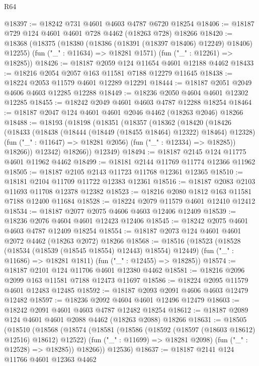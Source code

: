 \begin{lexlean}{R64}
\begin{coremodule}
@18397 := @18242 @731 @4601 @4603 @4787 @6720 @18254
@18406 := @18187 @729 @124 @4601 @4601 @728 @4462 (@18263 @728) @18266
@18420 := @18368
    (@18375
      (@18380 (@18386 (@18391 (@18397 @18406) @12249) @18406) @12255)
      (fun ("_" : @11634) => @18281 @1571)
      (fun ("_" : @12261) => @18285))
@18426 := @18187 @2059 @124 @11654 @4601 @12188 @4462
@18433 := @18216 @2054 @2057 @163 @11581 @7188 @12279 @11645
@18438 := @18224 @2053 @11579 @4601 @12289 @12291
@18444 := @18187 @2051 @2049 @4606 @4603 @12285 @12288
@18449 := @18236 @2050 @4604 @4601 @12302 @12285
@18455 := @18242 @2049 @4601 @4603 @4787 @12288 @18254
@18464 := @18187 @2047 @124 @4601 @4601 @2046 @4462 (@18263 @2046) @18266
@18488 := @18193
    (@18198
      (@18351
        (@18357
          (@18362
            (@18420
              (@18426
                (@18433
                  (@18438 (@18444 (@18449 (@18455 @18464) @12322) @18464) @12328)
                  (fun ("_" : @11647) => @18281 @2056)
                  (fun ("_" : @12334) => @18285))
                @18266))
            @12342)
          @18266))
      @12349)
@18494 := @18187 @2145 @124 @11775 @4601 @11962 @4462
@18499 := @18181 @2144 @11769 @11774 @12366 @11962
@18505 := @18187 @2105 @2143 @11723 @11768 @12361 @12365
@18510 := @18181 @2104 @11709 @11722 @12383 @12361
@18516 := @18187 @2083 @2103 @11693 @11708 @12378 @12382
@18523 := @18216 @2080 @1812 @163 @11581 @7188 @12400 @11684
@18528 := @18224 @2079 @11579 @4601 @12410 @12412
@18534 := @18187 @2077 @2075 @4606 @4603 @12406 @12409
@18539 := @18236 @2076 @4604 @4601 @12423 @12406
@18545 := @18242 @2075 @4601 @4603 @4787 @12409 @18254
@18554 := @18187 @2073 @124 @4601 @4601 @2072 @4462 (@18263 @2072) @18266
@18568 := @18516
    (@18523
      (@18528 (@18534 (@18539 (@18545 @18554) @12443) @18554) @12449)
      (fun ("_" : @11686) => @18281 @1811)
      (fun ("_" : @12455) => @18285))
@18574 := @18187 @2101 @124 @11706 @4601 @12380 @4462
@18581 := @18216 @2096 @2099 @163 @11581 @7188 @12473 @11697
@18586 := @18224 @2095 @11579 @4601 @12483 @12485
@18592 := @18187 @2093 @2091 @4606 @4603 @12479 @12482
@18597 := @18236 @2092 @4604 @4601 @12496 @12479
@18603 := @18242 @2091 @4601 @4603 @4787 @12482 @18254
@18612 := @18187 @2089 @124 @4601 @4601 @2088 @4462 (@18263 @2088) @18266
@18631 := @18505
    (@18510
      (@18568
        (@18574
          (@18581
            (@18586 (@18592 (@18597 (@18603 @18612) @12516) @18612) @12522)
            (fun ("_" : @11699) => @18281 @2098)
            (fun ("_" : @12528) => @18285))
          @18266))
      @12536)
@18637 := @18187 @2141 @124 @11766 @4601 @12363 @4462

\end{coremodule}
\end{lexlean}
